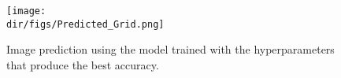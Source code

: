 \begin{figure}[htpb]
    \centering
    \texttt{[image: \\dir/figs/Predicted\_Grid.png]}
    \caption[Image Prediction using the model with the best accuracy]{Image prediction using the model trained with the hyperparameters that produce the best accuracy.}
    \label{fig.prediction}
\end{figure}
